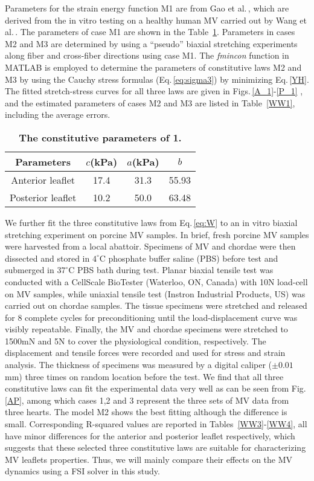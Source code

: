 \documentclass[fleqn,10pt]{wlscirep}
\begin{document}
Parameters for the strain energy function M1 are from Gao et al.\,\cite{Hao2014A}, which are derived from the in vitro testing on a healthy human MV carried out by Wang et al.\,\cite{Qian2013Finite}. The parameters of case M1 are shown in the Table~\ref{tab:W1}. Parameters in cases M2 and M3 are determined by using a ``pseudo'' biaxial stretching experiments along fiber  and cross-fiber directions using case M1. The \textit{fmincon} function in MATLAB is employed to determine the parameters of constitutive laws M2 and M3 by using the Cauchy stress formulas (Eq.\,\ref{eq:sigma3}) by minimizing Eq.\,\ref{YH}. The fitted stretch-stress curves for all three laws are given in Figs.\,\ref{A_1}-\ref{P_1} , and the estimated parameters of cases M2 and M3 are listed in Table~\ref{WW1}, including the average errors.  

\begin{table}[!h]
	\centering
	\caption{\bf The constitutive parameters of 1.}
	\label{tab:W1}
	\begin{tabular}{cccc}
		\hline
		Parameters & $c$(kPa) & $a$(kPa) & $b$\\\hline
		Anterior leaflet  & 17.4 & 31.3 & 55.93 \\\hline
		Posterior leaflet & 10.2 & 50.0 & 63.48 \\\hline
	\end{tabular}
\end{table}

We further fit the three constitutive laws from Eq.\,\ref{eq:W} to an in vitro biaxial stretching experiment on porcine MV samples. In brief, fresh porcine MV samples were harvested from a local abattoir. Specimens of MV and chordae were then dissected and stored in $4 ^{\circ}\mathrm{C}$ phosphate buffer saline (PBS) before test and submerged in $37 ^{\circ}\mathrm{C}$ PBS bath during test. Planar biaxial tensile test was conducted with a CellScale BioTester (Waterloo, ON, Canada) with 10N load-cell on MV samples, while uniaxial tensile test (Instron Industrial Products, US) was carried out on chordae samples. The tissue specimens were stretched and released for 8 complete cycles for preconditioning until the load-displacement curve was visibly repeatable. Finally, the MV and chordae specimens were stretched to 1500mN and 5N to cover the physiological condition, respectively. The displacement and tensile forces were recorded and used for stress and strain analysis. The thickness of specimens was  measured by a digital caliper ($\pm0.01$mm) three times on random location before the test. We find that all three constitutive laws can fit the experimental data very well as can be seen from Fig.\,\ref{AP}, among which cases 1,2 and 3 represent the three sets of MV data from three hearts.  The model M2 shows the best fitting although the difference is small.  Corresponding R-squared values are reported in Tables~\ref{WW3}-\ref{WW4}, all have minor differences for the anterior and posterior leaflet respectively, which suggests that these selected three constitutive laws are suitable for characterizing MV leaflets properties. Thus, we will mainly compare their effects on the MV dynamics using a FSI solver in this study. 
\end{document}
